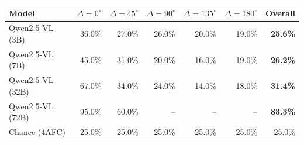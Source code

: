 \begin{tabular}{lrrrrrr}
\toprule
Model & $\Delta=0^\circ$ & $\Delta=45^\circ$ & $\Delta=90^\circ$ & $\Delta=135^\circ$ & $\Delta=180^\circ$ & Overall \\
\midrule
Qwen2.5-VL (3B) & 36.0\% & 27.0\% & 26.0\% & 20.0\% & 19.0\% & \textbf{25.6\%} \\
Qwen2.5-VL (7B) & 45.0\% & 31.0\% & 20.0\% & 16.0\% & 19.0\% & \textbf{26.2\%} \\
Qwen2.5-VL (32B) & 67.0\% & 34.0\% & 24.0\% & 14.0\% & 18.0\% & \textbf{31.4\%} \\
Qwen2.5-VL (72B) & 95.0\% & 60.0\% & -- & -- & -- & \textbf{83.3\%} \\
\midrule
Chance (4AFC) & 25.0\% & 25.0\% & 25.0\% & 25.0\% & 25.0\% & 25.0\% \\
\bottomrule
\end{tabular}
